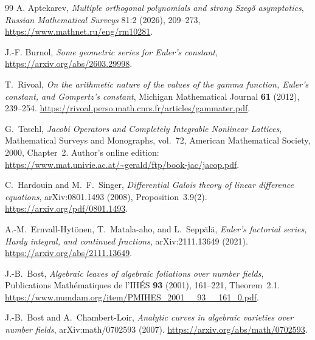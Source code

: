 \documentclass[11pt,a4paper]{article}
\theoremstyle{definition}
\theoremstyle{remark}
\theoremstyle{plain}
\numberwithin{equation}{section}
\begin{document}
\begin{thebibliography}{99}
 A. Aptekarev,
\emph{Multiple orthogonal polynomials and strong Szeg\H{o} asymptotics},
\emph{Russian Mathematical Surveys} 81:2 (2026), 209--273,
\url{https://www.mathnet.ru/eng/rm10281}.

 J.-F. Burnol,
\emph{Some geometric series for Euler's constant},
\url{https://arxiv.org/abs/2603.29998}.

 T.~Rivoal, \emph{On the arithmetic nature of the values of the gamma
function, Euler's constant, and Gompertz's constant},
Michigan Mathematical Journal \textbf{61} (2012), 239--254.
\url{https://rivoal.perso.math.cnrs.fr/articles/gammater.pdf}.

 G.~Teschl, \emph{Jacobi Operators and Completely Integrable Nonlinear
Lattices}, Mathematical Surveys and Monographs, vol.~72,
American Mathematical Society, 2000, Chapter~2.
Author's online edition:
\url{https://www.mat.univie.ac.at/~gerald/ftp/book-jac/jacop.pdf}.

 C.~Hardouin and M.~F.~Singer, \emph{Differential Galois theory of linear
difference equations}, arXiv:0801.1493 (2008), Proposition~3.9(2).
\url{https://arxiv.org/pdf/0801.1493}.

 A.-M.~Ernvall-Hyt\"onen, T.~Matala-aho, and L.~Sepp\"al\"a,
\emph{Euler's factorial series, Hardy integral, and continued fractions},
arXiv:2111.13649 (2021).
\url{https://arxiv.org/abs/2111.13649}.

 J.-B.~Bost, \emph{Algebraic leaves of algebraic foliations over number
fields}, Publications Math\'ematiques de l'IH\'ES \textbf{93} (2001),
161--221, Theorem~2.1.
\url{https://www.numdam.org/item/PMIHES_2001__93__161_0.pdf}.

 J.-B.~Bost and A.~Chambert-Loir, \emph{Analytic curves in algebraic
varieties over number fields}, arXiv:math/0702593 (2007).
\url{https://arxiv.org/abs/math/0702593}.
\end{thebibliography}
\end{document}
